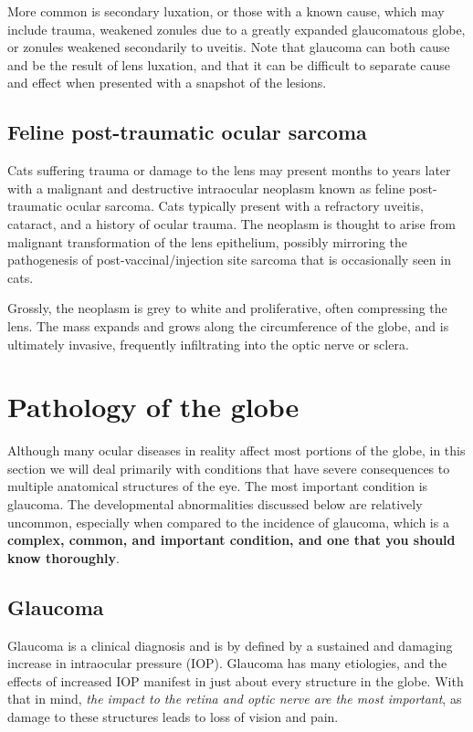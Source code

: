 \documentclass[openany]{book}
\begin{document}
More common is secondary luxation, or those with a known cause, which
may include trauma, weakened zonules due to a greatly expanded
glaucomatous globe, or zonules weakened secondarily to uveitis. Note
that glaucoma can both cause and be the result of lens luxation, and
that it can be difficult to separate cause and effect when presented
with a snapshot of the lesions.

\section{Feline post-traumatic ocular
sarcoma}\label{feline-post-traumatic-ocular-sarcoma}

Cats suffering trauma or damage to the lens may present months to years
later with a malignant and destructive intraocular neoplasm known as
feline post-traumatic ocular sarcoma. Cats typically present with a
refractory uveitis, cataract, and a history of ocular trauma. The
neoplasm is thought to arise from malignant transformation of the lens
epithelium, possibly mirroring the pathogenesis of
post-vaccinal/injection site sarcoma that is occasionally seen in cats.

Grossly, the neoplasm is grey to white and proliferative, often
compressing the lens. The mass expands and grows along the circumference
of the globe, and is ultimately invasive, frequently infiltrating into
the optic nerve or sclera.

\chapter{Pathology of the globe}\label{pathology-of-the-globe}

Although many ocular diseases in reality affect most portions of the
globe, in this section we will deal primarily with conditions that have
severe consequences to multiple anatomical structures of the eye. The
most important condition is glaucoma. The developmental abnormalities
discussed below are relatively uncommon, especially when compared to the
incidence of glaucoma, which is a \textbf{complex, common, and important
condition, and one that you should know thoroughly}.

\hypertarget{glaucoma}{\section{Glaucoma}\label{glaucoma}}

Glaucoma is a clinical diagnosis and is by defined by a sustained and
damaging increase in intraocular pressure (IOP). Glaucoma has many
etiologies, and the effects of increased IOP manifest in just about
every structure in the globe. With that in mind, \emph{the impact to the
retina and optic nerve are the most important}, as damage to these
structures leads to loss of vision and pain.
\end{document}

